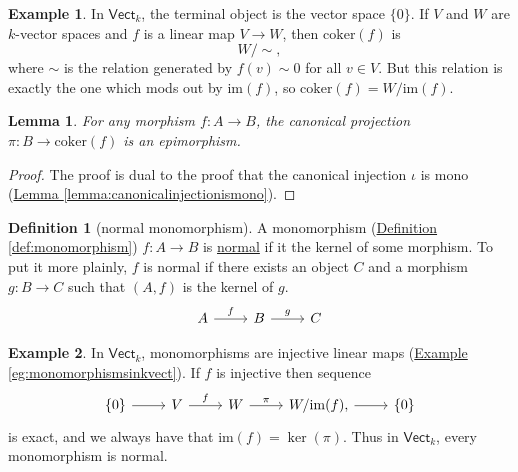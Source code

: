 \documentclass[a4paper,10pt]{scrreprt}
\newcommand{\defn}[1]{\ul{#1}}
\newcommand{\coker}{\mathrm{coker}}
\theoremstyle{definition}
\newtheorem{definition}{Definition}[section]
\newtheorem{example}{Example}[section]
\theoremstyle{plain}
\newtheorem{lemma}{Lemma}[section]
\theoremstyle{remark}
\begin{document}
\begin{example}
  \label{eg:invectcokernelsarequotientsbyimage}
  In $\mathsf{Vect}_{k}$, the terminal object is the vector space $\{0\}$. If $V$ and $W$ are $k$-vector spaces and $f$ is a linear map $V \to W$, then $\coker(f)$ is
  \begin{equation*}
    W / \sim, 
  \end{equation*}
  where $\sim$ is the relation generated by $f(v) \sim 0$ for all $v \in V$. But this relation is exactly the one which mods out by $\mathrm{im}(f)$, so $\coker(f) = W / \mathrm{im}(f)$.
\end{example}

\begin{lemma}
  \label{lemma:canonicalsurjectionisepi}
  For any morphism $f\colon A \to B$, the canonical projection $\pi\colon B \to \coker(f)$ is an epimorphism.
\end{lemma}
\begin{proof}
  The proof is dual to the proof that the canonical injection $\iota$ is mono (\hyperref[lemma:canonicalinjectionismono]{Lemma \ref*{lemma:canonicalinjectionismono}}).
\end{proof}

\begin{definition}[normal monomorphism]
  \label{def:normalmonomorphism}
  A monomorphism (\hyperref[def:monomorphism]{Definition \ref*{def:monomorphism}}) $f\colon A \to B$ is \defn{normal} if it the kernel of some morphism. To put it more plainly, $f$ is normal if there exists an object $C$ and a morphism $g\colon B \to C$ such that $(A, f)$ is the kernel of $g$.
  \begin{equation*}
    \begin{tikzcd}
      A \arrow[r, "f"] & B \arrow[r, "g"] & C
    \end{tikzcd}
  \end{equation*}
\end{definition}

\begin{example}
  In $\mathsf{Vect}_{k}$, monomorphisms are injective linear maps (\hyperref[eg:monomorphismsinkvect]{Example \ref*{eg:monomorphismsinkvect}}). If $f$ is injective then sequence
  \begin{equation*}
    \begin{tikzcd}
      \{0\} \arrow[r] & V \arrow[r, "f"] & W \arrow[r, "\pi"] & W/\mathrm{im}(f) \arrow[r], & \{0\}
    \end{tikzcd}
  \end{equation*}
  is exact, and we always have that $\mathrm{im}(f) = \ker(\pi)$. Thus in $\mathsf{Vect}_{k}$, every monomorphism is normal.
\end{example}
\end{document}
